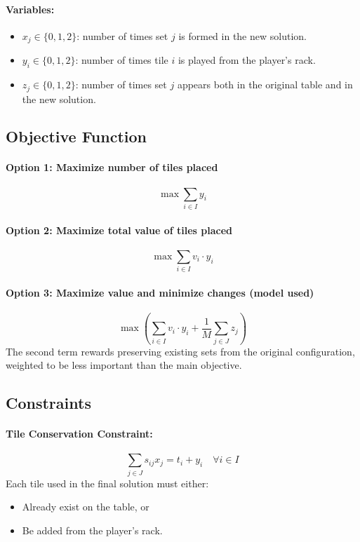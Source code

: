 \documentclass[11pt,letterpaper]{article}
\begin{document}
\paragraph{Variables:}
\begin{itemize}
    \item $x_j \in \{0, 1, 2\}$: number of times set $j$ is formed in the new solution.
    \item $y_i \in \{0, 1, 2\}$: number of times tile $i$ is played from the player’s rack.
    \item $z_j \in \{0, 1, 2\}$: number of times set $j$ appears both in the original table and in the new solution.
\end{itemize}

\subsection*{Objective Function}

\paragraph{Option 1: Maximize number of tiles placed}
\[
\max \sum_{i \in I} y_i
\]

\paragraph{Option 2: Maximize total value of tiles placed}
\[
\max \sum_{i \in I} v_i \cdot y_i
\]

\paragraph{Option 3: Maximize value and minimize changes (model used)}
\[
\max \left( \sum_{i \in I} v_i \cdot y_i + \frac{1}{M} \sum_{j \in J} z_j \right)
\]
The second term rewards preserving existing sets from the original configuration, weighted to be less important than the main objective.

\subsection*{Constraints}

\paragraph{Tile Conservation Constraint:}
\[
\sum_{j \in J} s_{ij} x_j = t_i + y_i \quad \forall i \in I
\]
Each tile used in the final solution must either:
\begin{itemize}
    \item Already exist on the table, or
    \item Be added from the player’s rack.
\end{itemize}
\end{document}
